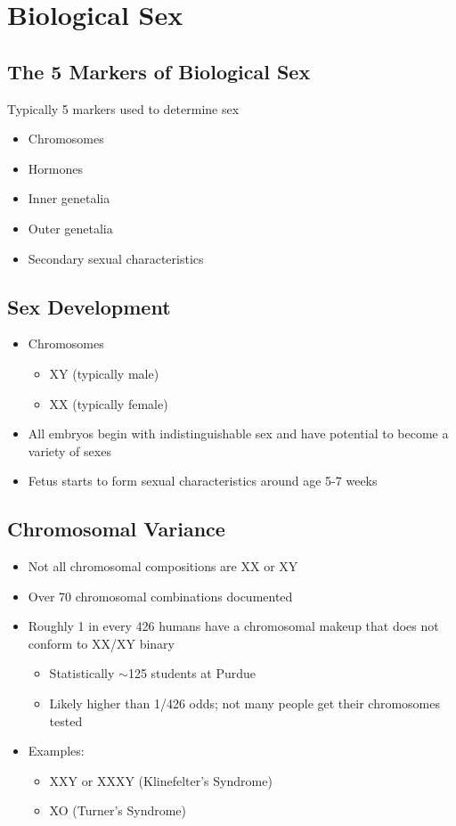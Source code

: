 \documentclass[a4paper]{article}
\begin{document}
\section{Biological Sex} %

\subsection{The 5 Markers of Biological Sex}
Typically 5 markers used to determine sex
\begin{itemize}
  \item Chromosomes
  \item Hormones
  \item Inner genetalia
  \item Outer genetalia
  \item Secondary sexual characteristics
\end{itemize}

\subsection{Sex Development}
\begin{itemize}
  \item Chromosomes \begin{itemize}
    \item XY (typically male)
    \item XX (typically female)
  \end{itemize}
  \item All embryos begin with indistinguishable sex and have potential to become a variety of sexes
  \item Fetus starts to form sexual characteristics around age 5-7 weeks
\end{itemize}

\subsection{Chromosomal Variance}
\begin{itemize}
  \item Not all chromosomal compositions are XX or XY
  \item Over 70 chromosomal combinations documented
  \item Roughly 1 in every 426 humans have a chromosomal makeup that does not conform to XX/XY binary \begin{itemize}
    \item Statistically \( \sim \)125 students at Purdue
    \item Likely higher than 1/426 odds; not many people get their chromosomes tested
  \end{itemize}
  \item Examples: \begin{itemize}
    \item XXY or XXXY (Klinefelter's Syndrome)
    \item XO (Turner's Syndrome)
  \end{itemize}
\end{itemize}
\end{document}
